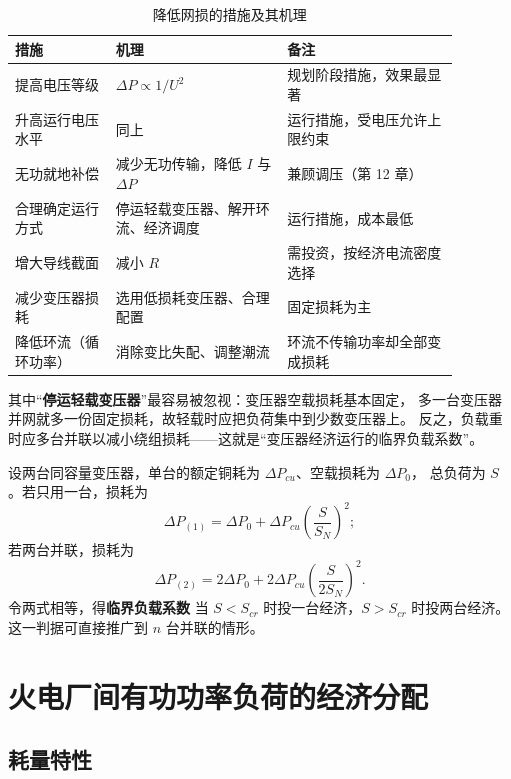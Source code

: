 \begin{table}[htbp]
  \centering
  \caption{降低网损的措施及其机理}
  \small
  \begin{tabular}{@{}p{0.20\linewidth}p{0.34\linewidth}p{0.34\linewidth}@{}}
    \toprule
    措施 & 机理 & 备注 \\
    \midrule
    提高电压等级 & $\Delta P\propto1/U^{2}$ & 规划阶段措施，效果最显著 \\
    升高运行电压水平 & 同上 & 运行措施，受电压允许上限约束 \\
    无功就地补偿 & 减少无功传输，降低 $I$ 与 $\Delta P$ & 兼顾调压（第 12 章） \\
    合理确定运行方式 & 停运轻载变压器、解开环流、经济调度 & 运行措施，成本最低 \\
    增大导线截面 & 减小 $R$ & 需投资，按经济电流密度选择 \\
    减少变压器损耗 & 选用低损耗变压器、合理配置 & 固定损耗为主 \\
    降低环流（循环功率） & 消除变比失配、调整潮流 & 环流不传输功率却全部变成损耗 \\
    \bottomrule
  \end{tabular}
\end{table}

其中“\textbf{停运轻载变压器}”最容易被忽视：变压器空载损耗基本固定，
多一台变压器并网就多一份固定损耗，故轻载时应把负荷集中到少数变压器上。
反之，负载重时应多台并联以减小绕组损耗——这就是“变压器经济运行的临界负载系数”。

设两台同容量变压器，单台的额定铜耗为 $\Delta P_{cu}$、空载损耗为 $\Delta P_0$，
总负荷为 $S$。若只用一台，损耗为
\begin{equation}
  \Delta P_{(1)}=\Delta P_0+\Delta P_{cu}\left(\frac{S}{S_N}\right)^{2};
\end{equation}
若两台并联，损耗为
\begin{equation}
  \Delta P_{(2)}=2\Delta P_0+2\Delta P_{cu}\left(\frac{S}{2S_N}\right)^{2}.
\end{equation}
令两式相等，得\textbf{临界负载系数}
当 $S<S_{cr}$ 时投一台经济，$S>S_{cr}$ 时投两台经济。这一判据可直接推广到 $n$ 台并联的情形。

\section{火电厂间有功功率负荷的经济分配}

\subsection{耗量特性}

